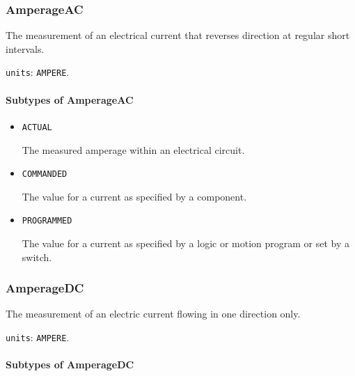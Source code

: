 \subsubsection{AmperageAC}
\label{sec:AmperageAC}



The measurement of an electrical current that reverses direction at regular short intervals.


\texttt{units}: \texttt{AMPERE}.

\paragraph{Subtypes of AmperageAC}\mbox{}
\label{sec:Subtypes of AmperageAC}

\begin{itemize}

\item \texttt{ACTUAL}


The measured amperage within an electrical circuit.

\item \texttt{COMMANDED}


The value for a current as specified by a component. 

\item \texttt{PROGRAMMED}


The value for a current as specified by a logic or motion program or set by a switch.


\end{itemize}






\subsubsection{AmperageDC}
\label{sec:AmperageDC}



The measurement of an electric current flowing in one direction only.


\texttt{units}: \texttt{AMPERE}.

\paragraph{Subtypes of AmperageDC}\mbox{}
\label{sec:Subtypes of AmperageDC}

